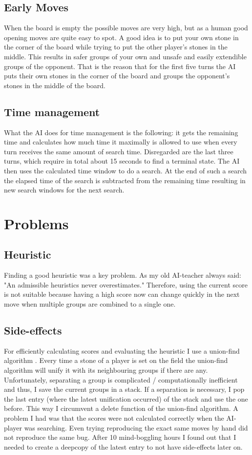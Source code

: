 \documentclass[a4paper]{article}
\begin{document}
\subsection{Early Moves}
When the board is empty the possible moves are very high, but as a human good opening moves are quite easy to spot. A good idea is to put your own stone in the corner of the board while trying to put the other player's stones in the middle. This results in safer groups of your own and unsafe and easily extendible groups of the opponent.
That is the reason that for the first five turns the AI puts their own stones in the corner of the board and groups the opponent's stones in the middle of the board.

\subsection{Time management}
What the AI does for time management is the following: it gets the remaining time and calculates how much time it maximally is allowed to use when every turn receives the same amount of search time. Disregarded are the last three turns, which require in total about 15 seconds to find a terminal state. The AI then uses the calculated time window to do a search. At the end of such a search the elapsed time of the search is subtracted from the remaining time resulting in new  search windows for the next search.

\section{Problems}
\subsection{Heuristic}
Finding a good heuristic was a key problem. As my old AI-teacher always said: "An admissible heuristics never overestimates." Therefore, using the current score is not suitable because having a high score now can change quickly in the next move when multiple groups are combined to a single one. 

\subsection{Side-effects}
For efficiently calculating scores and evaluating the heuristic I use a union-find algorithm \cite{galler1964improved}. Every time a stone of a player is set on the field the union-find algorithm will unify it with its neighbouring groups if there are any. Unfortunately, separating a group is complicated / computationally inefficient and thus, I save the current groups in a stack. If a separation is necessary, I pop the last entry (where the latest unification occurred) of the stack and use the one before. This way I circumvent a delete function of the union-find algorithm.
A problem I had was that the scores were not calculated correctly when the AI-player was searching. Even trying reproducing the exact same moves by hand did not reproduce the same bug. After 10 mind-boggling hours I found out that I needed to create a deepcopy of the latest entry to not have side-effects later on.




\end{document}
